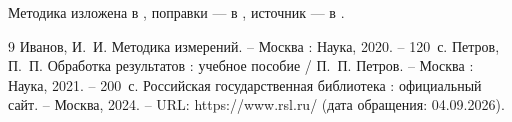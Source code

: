 Методика изложена в \cite{ivanov}, поправки — в \cite{petrov},
источник — в \cite{site}.

\begin{thebibliography}{9}
   Иванов, И.~И. Методика измерений. – Москва : Наука, 2020. – 120~с.
   Петров, П.~П. Обработка результатов : учебное пособие /
  П.~П. Петров. – Москва : Наука, 2021. – 200~с.
   Российская государственная библиотека : официальный сайт. –
  Москва, 2024. – URL: https://www.rsl.ru/ (дата обращения: 04.09.2026).
\end{thebibliography}
